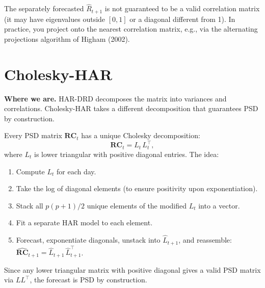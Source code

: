 \begin{warning}
The separately forecasted $\hat{R}_{t+1}$ is not guaranteed to be a valid
correlation matrix (it may have eigenvalues outside $[0,1]$ or a diagonal
different from 1). In practice, you project onto the nearest correlation
matrix, e.g., via the alternating projections algorithm of Higham (2002).
\end{warning}


\section{Cholesky-HAR}\label{sec:multivariate:cholesky}

\textbf{Where we are.}  HAR-DRD decomposes the matrix into variances and
correlations. Cholesky-HAR takes a different decomposition that guarantees PSD
by construction.

\begin{keyidea}
Every PSD matrix $\mathbf{RC}_t$ has a unique Cholesky decomposition:
\[
  \mathbf{RC}_t = L_t\, L_t^\top,
\]
where $L_t$ is lower triangular with positive diagonal entries. The idea:
\begin{enumerate}[nosep]
  \item Compute $L_t$ for each day.
  \item Take the log of diagonal elements (to ensure positivity upon
        exponentiation).
  \item Stack all $p(p+1)/2$ unique elements of the modified $L_t$ into a
        vector.
  \item Fit a separate HAR model to each element.
  \item Forecast, exponentiate diagonals, unstack into $\hat{L}_{t+1}$,
        and reassemble:
        $\widehat{\mathbf{RC}}_{t+1} = \hat{L}_{t+1}\,\hat{L}_{t+1}^\top$.
\end{enumerate}
Since any lower triangular matrix with positive diagonal gives a valid PSD
matrix via $LL^\top$, the forecast is PSD by construction.
\end{keyidea}

